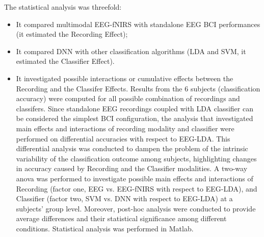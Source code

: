\documentclass[12pt ]{iopart}
\begin{document}
The statistical analysis was threefold:
\begin{itemize}
\item It compared multimodal EEG-fNIRS with standalone EEG  BCI performances (it estimated the Recording Effect);
\item It compared DNN with other classification  algorithms (LDA and SVM, it estimated the Classifier Effect).
\item It investigated possible interactions or cumulative effects between the Recording and the Classifer Effects.
Results from the 6 subjects (classification accuracy) were computed for all possible combination of recordings and classifers. 
Since standalone EEG recordings coupled with LDA classifier can be considered the simplest BCI configuration, the analysis that investigated main effects and interactions of recording modality and classifier were performed on differential accuracies with respect to EEG-LDA.
This differential analysis was conducted to dampen the problem of the intrinsic variability of  the classification outcome among subjects, highlighting changes in accuracy caused by  Recording and the Classifier modalities.
A two-way anova was performed to investigate possible main effects and interactions of Recording  (factor one, EEG vs. EEG-fNIRS with respect to EEG-LDA), and  Classifier (factor two, SVM vs. DNN with respect to EEG-LDA) at a subjects' group level.
Moreover, post-hoc analysis were conducted to provide average differences and their statistical significance among different conditions.
Statistical analysis was performed in Matlab.
\end{itemize} 
\end{document}
